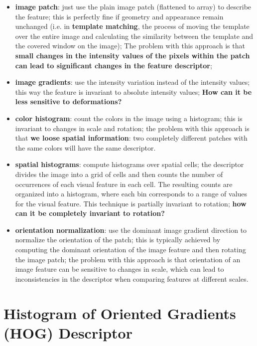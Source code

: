 \documentclass{article}
\begin{document}
\begin{itemize}
    \item \textbf{image patch}: just use the plain image patch (flattened to array) to describe the feature; this is perfectly fine if geometry and appearance remain unchanged (i.e. in \textbf{template matching}, the process of moving the template over the entire image and calculating the similarity between the template and the covered window on the image); The problem with this approach is that \textbf{small changes in the intensity values of the pixels within the patch can lead to significant changes in the feature descriptor};
    \item \textbf{image gradients}: use the intensity variation instead of the intensity values; this way the feature is invariant to absolute intensity values; \textbf{How can it be less sensitive to deformations?}
    \item \textbf{color histogram}: count the colors in the image using a histogram; this is invariant to changes in scale and rotation; the problem with this approach is that \textbf{we loose spatial information}: two completely different patches with the same colors will have the same descriptor.
    \item \textbf{spatial histograms}: compute histograms over spatial cells; the descriptor divides the image into a grid of cells and then counts the number of occurrences of each visual feature in each cell. The resulting counts are organized into a histogram, where each bin corresponds to a range of values for the visual feature. This technique is partially invariant to rotation; \textbf{how can it be completely invariant to rotation?}
    \item \textbf{orientation normalization}: use the dominant image gradient direction to normalize the orientation of the patch; this is typically achieved by computing the dominant orientation of the image feature and then rotating the image patch; the problem with this approach is that orientation of an image feature can be sensitive to changes in scale, which can lead to inconsistencies in the descriptor when comparing features at different scales.
\end{itemize}

\section*{Histogram of Oriented Gradients (HOG) Descriptor}
\end{document}
